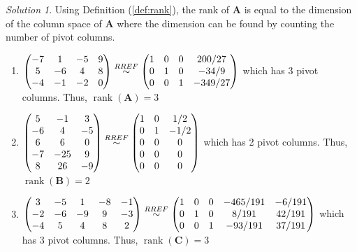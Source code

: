 \documentclass[
]{book}
\theoremstyle{definition}
\theoremstyle{definition}
\theoremstyle{definition}
\theoremstyle{definition}
\theoremstyle{remark}
\newtheorem*{solution}{Solution}
\begin{document}
\begin{solution}

Using Definition (\ref{def:rank}), the rank of \(\mathbf{A}\) is equal to the dimension of the column space of \(\mathbf{A}\) where the dimension can be found by counting the number of pivot columns.

\begin{enumerate}
\def\labelenumi{\arabic{enumi})}
\item
  \(\begin{pmatrix} -7 & 1 & -5 & 9 \\ 5 & -6 & 4 & 8 \\ -4 & -1 & -2 & 0 \end{pmatrix} \stackrel{RREF}{\huge \sim} \begin{pmatrix} 1 & 0 & 0 & 200/27 \\ 0 & 1 & 0 & -34/9 \\ 0 & 0 & 1 & -349/27 \end{pmatrix}\) which has 3 pivot columns. Thus, \(\operatorname{rank}(\mathbf{A}) = 3\)
\item
  \(\begin{pmatrix} 5 & -1 & 3 \\ -6 & 4 & -5 \\ 6 & 6 & 0 \\ -7 & -25 & 9 \\ 8 & 26 & -9 \end{pmatrix} \stackrel{RREF}{\huge \sim} \begin{pmatrix} 1 & 0 & 1/2 \\ 0 & 1 & -1/2 \\ 0 & 0 & 0 \\ 0 & 0 & 0 \\ 0 & 0 & 0 \end{pmatrix}\) which has 2 pivot columns. Thus, \(\operatorname{rank}(\mathbf{B}) = 2\)
\item
  \(\begin{pmatrix} 3 & -5 & 1 & -8 & -1 \\ -2 & -6 & -9 & 9 & -3 \\ -4 & 5 & 4 & 8 & 2 \end{pmatrix} \stackrel{RREF}{\huge \sim} \begin{pmatrix} 1 & 0 & 0 & -465/191 & -6/191 \\ 0 & 1 & 0 & 8/191 & 42/191 \\ 0 & 0 & 1 & -93/191 & 37/191 \end{pmatrix}\) which has 3 pivot columns. Thus, \(\operatorname{rank}(\mathbf{C}) = 3\)
\end{enumerate}

\end{solution}
\end{document}
